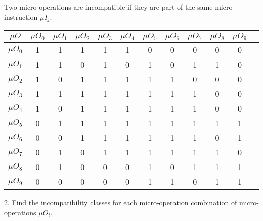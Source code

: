 Two micro-operations are incompatible if they are part of the same micro-instruction $\mu I_{j}$.
\begin{table}[H]
    \centering
    \begin{tabular}{|c|c|c|c|c|c|c|c|c|c|c|c|}
        \hline
        $\mu O$ & $\mu O_{0}$ & $\mu O_{1}$ & $\mu O_{2}$ & $\mu O_{3}$ & $\mu O_{4}$ & $\mu O_{5}$ & $\mu O_{6}$ & $\mu O_{7}$ & $\mu O_{8}$ & $\mu O_{9}$ \\ \hline
        $\mu O_{0}$ & 1 & 1 & 1 & 1 & 1 & 0 & 0 & 0 & 0 & 0 \\ \hline
        $\mu O_{1}$ & 1 & 1 & 0 & 1 & 0 & 1 & 0 & 1 & 1 & 0 \\ \hline
        $\mu O_{2}$ & 1 & 0 & 1 & 1 & 1 & 1 & 1 & 0 & 0 & 0 \\ \hline
        $\mu O_{3}$ & 1 & 1 & 1 & 1 & 1 & 1 & 1 & 1 & 0 & 0 \\ \hline
        $\mu O_{4}$ & 1 & 0 & 1 & 1 & 1 & 1 & 1 & 1 & 0 & 0 \\ \hline
        $\mu O_{5}$ & 0 & 1 & 1 & 1 & 1 & 1 & 1 & 1 & 1 & 1 \\ \hline
        $\mu O_{6}$ & 0 & 0 & 1 & 1 & 1 & 1 & 1 & 1 & 0 & 1 \\ \hline
        $\mu O_{7}$ & 0 & 1 & 0 & 1 & 1 & 1 & 1 & 1 & 1 & 0 \\ \hline
        $\mu O_{8}$ & 0 & 1 & 0 & 0 & 0 & 1 & 0 & 1 & 1 & 1 \\ \hline
        $\mu O_{9}$ & 0 & 0 & 0 & 0 & 0 & 1 & 1 & 0 & 1 & 1 \\ \hline
    \end{tabular}
\end{table}

2. Find the incompatibility classes for each micro-operation combination of micro-operations $\mu O_{i}$.

